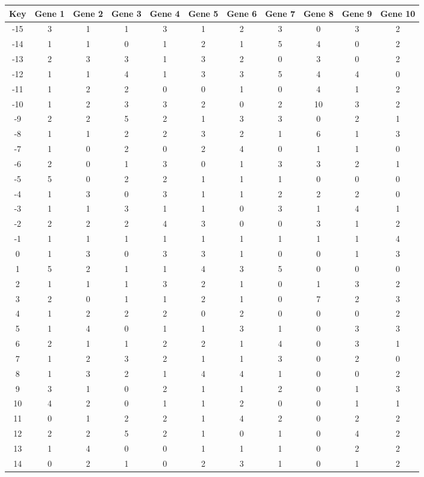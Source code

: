 \begin{tabular}{|c|c|c|c|c|c|c|c|c|c|c|}
\hline
Key & Gene 1 & Gene 2 & Gene 3 & Gene 4 & Gene 5 & Gene 6 & Gene 7 & Gene 8 & Gene 9 & Gene 10 \\
\hline
-15 & 3 & 1 & 1 & 3 & 1 & 2 & 3 & 0 & 3 & 2 \\
-14 & 1 & 1 & 0 & 1 & 2 & 1 & 5 & 4 & 0 & 2 \\
-13 & 2 & 3 & 3 & 1 & 3 & 2 & 0 & 3 & 0 & 2 \\
-12 & 1 & 1 & 4 & 1 & 3 & 3 & 5 & 4 & 4 & 0 \\
-11 & 1 & 2 & 2 & 0 & 0 & 1 & 0 & 4 & 1 & 2 \\
-10 & 1 & 2 & 3 & 3 & 2 & 0 & 2 & 10 & 3 & 2 \\
-9 & 2 & 2 & 5 & 2 & 1 & 3 & 3 & 0 & 2 & 1 \\
-8 & 1 & 1 & 2 & 2 & 3 & 2 & 1 & 6 & 1 & 3 \\
-7 & 1 & 0 & 2 & 0 & 2 & 4 & 0 & 1 & 1 & 0 \\
-6 & 2 & 0 & 1 & 3 & 0 & 1 & 3 & 3 & 2 & 1 \\
-5 & 5 & 0 & 2 & 2 & 1 & 1 & 1 & 0 & 0 & 0 \\
-4 & 1 & 3 & 0 & 3 & 1 & 1 & 2 & 2 & 2 & 0 \\
-3 & 1 & 1 & 3 & 1 & 1 & 0 & 3 & 1 & 4 & 1 \\
-2 & 2 & 2 & 2 & 4 & 3 & 0 & 0 & 3 & 1 & 2 \\
-1 & 1 & 1 & 1 & 1 & 1 & 1 & 1 & 1 & 1 & 4 \\
0 & 1 & 3 & 0 & 3 & 3 & 1 & 0 & 0 & 1 & 3 \\
1 & 5 & 2 & 1 & 1 & 4 & 3 & 5 & 0 & 0 & 0 \\
2 & 1 & 1 & 1 & 3 & 2 & 1 & 0 & 1 & 3 & 2 \\
3 & 2 & 0 & 1 & 1 & 2 & 1 & 0 & 7 & 2 & 3 \\
4 & 1 & 2 & 2 & 2 & 0 & 2 & 0 & 0 & 0 & 2 \\
5 & 1 & 4 & 0 & 1 & 1 & 3 & 1 & 0 & 3 & 3 \\
6 & 2 & 1 & 1 & 2 & 2 & 1 & 4 & 0 & 3 & 1 \\
7 & 1 & 2 & 3 & 2 & 1 & 1 & 3 & 0 & 2 & 0 \\
8 & 1 & 3 & 2 & 1 & 4 & 4 & 1 & 0 & 0 & 2 \\
9 & 3 & 1 & 0 & 2 & 1 & 1 & 2 & 0 & 1 & 3 \\
10 & 4 & 2 & 0 & 1 & 1 & 2 & 0 & 0 & 1 & 1 \\
11 & 0 & 1 & 2 & 2 & 1 & 4 & 2 & 0 & 2 & 2 \\
12 & 2 & 2 & 5 & 2 & 1 & 0 & 1 & 0 & 4 & 2 \\
13 & 1 & 4 & 0 & 0 & 1 & 1 & 1 & 0 & 2 & 2 \\
14 & 0 & 2 & 1 & 0 & 2 & 3 & 1 & 0 & 1 & 2 \\
\hline
\end{tabular}